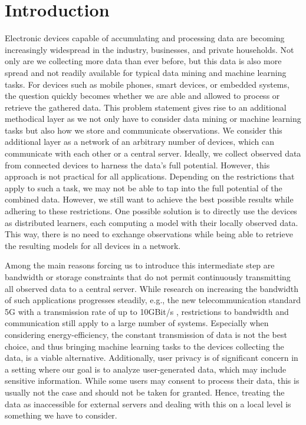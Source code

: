 \chapter{Introduction}
Electronic devices capable of accumulating and processing data are becoming increasingly widespread in the industry, businesses, and private households.
Not only are we collecting more data than ever before, but this data is also more spread and not readily available for typical data mining and machine learning tasks.
For devices such as mobile phones, smart devices, or embedded systems, the question quickly becomes whether we are able and allowed to process or retrieve the gathered data.
This problem statement gives rise to an additional methodical layer as we not only have to consider data mining or machine learning tasks but also how we store and communicate observations.
We consider this additional layer as a network of an arbitrary number of devices, which can communicate with each other or a central server.
Ideally, we collect observed data from connected devices to harness the data's full potential.
However, this approach is not practical for all applications.
Depending on the restrictions that apply to such a task, we may not be able to tap into the full potential of the combined data.
However, we still want to achieve the best possible results while adhering to these restrictions.
One possible solution is to directly use the devices as distributed learners, each computing a model with their locally observed data.
This way, there is no need to exchange observations while being able to retrieve the resulting models for all devices in a network.

Among the main reasons forcing us to introduce this intermediate step are bandwidth or storage constraints that do not permit continuously transmitting all observed data to a central server.
While research on increasing the bandwidth of such applications progresses steadily, e.g., the new telecommunication standard 5G with a transmission rate of up to 10GBit/s \cite{nordrum2017ieee}, restrictions to bandwidth and communication still apply to a large number of systems. 
Especially when considering energy-efficiency, the constant transmission of data is not the best choice, and thus bringing machine learning tasks to the devices collecting the data, is a viable alternative.
Additionally, user privacy is of significant concern in a setting where our goal is to analyze user-generated data, which may include sensitive information.
While some users may consent to process their data, this is usually not the case and should not be taken for granted. 
Hence, treating the data as inaccessible for external servers and dealing with this on a local level is something we have to consider.

